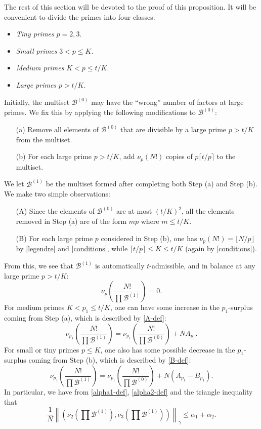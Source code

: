 \documentclass[12pt,a4paper,reqno]{amsart}
\numberwithin{equation}{section}
\theoremstyle{plain}
\theoremstyle{definition}
\newcommand\tuple{{\mathcal B}}
\begin{document}
The rest of this section will be devoted to the proof of this proposition.  It will be convenient to divide the primes into four classes:
  \begin{itemize}
    \item \emph{Tiny primes} $p=2,3$.
    \item \emph{Small primes} $3 < p \leq K$.
    \item \emph{Medium primes} $K < p \leq t/K$.
    \item \emph{Large primes} $p > t/K$.
    \end{itemize}
Initially, the multiset $\tuple^{(0)}$ may have the ``wrong'' number of factors at large primes.  We fix this by applying the following modifications to $\tuple^{(0)}$:
\begin{itemize}
  \item[(a)] Remove all elements of $\tuple^{(0)}$ that are divisible by a large prime $p > t/K$ from the multiset.
  \item[(b)] For each large prime $p > t/K$, add $\nu_p(N!)$ copies of $p \lceil t/p \rceil$ to the multiset.
\end{itemize}
We let $\tuple^{(1)}$ be the multiset formed after completing both Step (a) and Step (b).  We make two simple observations:
\begin{itemize}
\item[(A)] Since the elements of $\tuple^{(0)}$ are at most $(t/K)^2$, all the elements removed in Step (a) are of the form $mp$ where $m \leq t/K$.
\item[(B)] For each large prime $p$ considered in Step (b),  one has $\nu_p(N!) = \lfloor N/p \rfloor$ by \eqref{legendre} and \eqref{conditions}, while $\lceil t/p \rceil \leq K \leq t/K$ (again by \eqref{conditions}).  
\end{itemize}
From this, we see that $\tuple^{(1)}$ is automatically $t$-admissible, and in balance at any large prime $p > t/K$:
$$ \nu_p\left(\frac{N!}{\prod \tuple^{(1)}}\right) = 0.$$
For medium primes $K < p_1 \leq t/K$, one can have some increase in the $p_1$-surplus coming from Step (a), which is described by \eqref{A-def}:
$$ \nu_{p_1}\left(\frac{N!}{\prod \tuple^{(1)}}\right) = \nu_{p_1}\left(\frac{N!}{\prod \tuple^{(0)}}\right) + NA_{p_1}.$$
For small or tiny primes $p \leq K$, one also has some possible decrease in the $p_1$-surplus coming from Step (b), which is described by \eqref{B-def}:
$$ \nu_{p_1}\left(\frac{N!}{\prod \tuple^{(1)}}\right) = \nu_{p_1}\left(\frac{N!}{\prod \tuple^{(0)}}\right) + N(A_{p_1} - B_{p_1}).$$
In particular, we have from \eqref{alpha1-def}, \eqref{alpha2-def} and the triangle inequality that
\begin{equation}\label{alpha-1}
\frac{1}{N} \left\|\left( \nu_2\left(\prod \tuple^{(1)}\right), \nu_3\left(\prod \tuple^{(1)}\right)\right)\right\|_\gamma \leq \alpha_1 + \alpha_2.
\end{equation}
\end{document}
